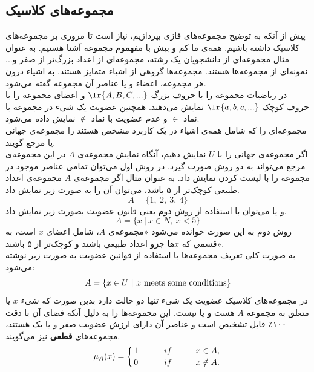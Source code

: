 \documentclass[12pt,a4paper]{article}
\theoremstyle{definition}
\begin{document}
 \subsection{مجموعه‌های کلاسیک}
پیش از آنکه به توضیح مجموعه‌های فازی بپردازیم، نیاز است تا مروری بر مجموعه‌های کلاسیک داشته باشیم. همه‌ی ما کم و بیش با مفهموم مجموعه آشنا هستیم. به عنوان مثال مجموعه‌ای از دانشجویان یک رشته، مجموعه‌ای از اعداد بزرگ‌تر از صفر و... نمونه‌ای از مجموعه‌ها هستند. مجموعه‌ها گروهی از اشیاء متمایز هستند. به اشیاء درون هر مجموعه، اعضاء و یا عناصر آن مجموعه گفته می‌شود. \\
در ریاضیات مجموعه را با حروف بزرگ 
$\lr{A,B,C,...}$
 و اعضای مجموعه را با حروف کوچک 
$\lr{a,b,c,...} $
  نمایش می‌دهند. همچنین عضویت یک شیء در مجموعه با نماد 
$\in$
 و عدم عضویت با نماد
 $\notin$
 نمایش داده می‌شود. 
 \cite{Bojadziev2007}
 \\
مجموعه‌ای را که شامل همه‌ی اشیاء در یک کاربرد مشخص هستند را مجموعه‌ی جهانی 
یا مرجع گویند. \\
اگر مجموعه‌ی جهانی را با $ U $  نمایش دهیم، آنگاه نمایش مجموعه‌ی $ A $  در این مجموعه‌ی مرجع می‌تواند به دو روش صورت گیرد. در روش اول می‌توان تمامی عناصر موجود در مجموعه را با لیست کردن 
نمایش داد. به عنوان مثال اگر مجموعه‌ی $ A $ مجموعه‌ی اعداد طبیعی کوچک‌تر از ۵ باشد، می‌توان آن را به صورت زیر نمایش داد.
\begin{equation}
A=\{1,\ 2,\ 3,\ 4\}
\end{equation}
و یا می‌توان با استفاده از روش دوم یعنی قانون عضویت
بصورت زیر نمایش داد.
\cite{Wang1997}
\begin{equation}
 A= \{ x\ |\ x \in N,\ x < 5\} 
 \end{equation}
 روش دوم به این صورت خوانده می‌شود «مجموعه‌ی $ A $، شامل اعضای $ x $ است، به قسمی که  $ x $ها جزو اعداد طبیعی باشند و کوچک‌تر از ۵ باشند».\\
 به صورت کلی تعریف مجموعه‌ها با استفاده از قوانین عضویت به صورت زیر نوشته می‌شود:
\begin{equation}
 A= \{  x \in U\ |\   x\ {\rm meets\ some\ conditions } \}
 \end{equation} 
 در مجموعه‌های کلاسیک عضویت یک شیء تنها دو حالت دارد بدین صورت که شیء $x$ یا متعلق به مجموعه $A$ هست و یا نیست. این مجموعه‌ها را به دلیل آنکه فضای آن با دقت ۱۰۰٪ قابل تشخیص است و عناصر آن دارای ارزش عضویت صفر و یا یک هستند، مجموعه‌های
  \textbf{قطعی}
  نیز می‌گویند. 
\begin{equation}\label{eq:e_1}
\mu_{A}(x)=\left \{ 
	{1 \atop 0}
	\hskip 1cm
   {if \hskip 1cm x \in A, \atop
	if \hskip 1cm x \notin A.} \right.
\end{equation} 
\end{document}
